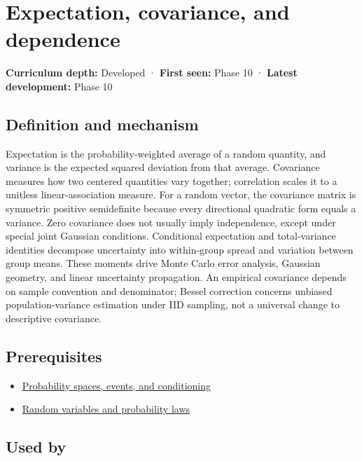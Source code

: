 \hypertarget{appendix-54c383df9992}{}\label{referencestart:appendix-54c383df9992}
\section{Expectation, covariance, and dependence}\label{appendix-54c383df9992-expectation-covariance-and-dependence}

\textbf{Curriculum depth:} Developed · \textbf{First seen:} Phase 10 · \textbf{Latest development:} Phase 10

\subsection{Definition and mechanism}\label{appendix-54c383df9992-definition-and-mechanism}

Expectation is the probability-weighted average of a random quantity, and variance is the expected squared deviation from that average. Covariance measures how two centered quantities vary together; correlation scales it to a unitless linear-association measure. For a random vector, the covariance matrix is symmetric positive semidefinite because every directional quadratic form equals a variance. Zero covariance does not usually imply independence, except under special joint Gaussian conditions. Conditional expectation and total-variance identities decompose uncertainty into within-group spread and variation between group means. These moments drive Monte Carlo error analysis, Gaussian geometry, and linear uncertainty propagation. An empirical covariance depends on sample convention and denominator; Bessel correction concerns unbiased population-variance estimation under IID sampling, not a universal change to descriptive covariance.

\subsection{Prerequisites}\label{appendix-54c383df9992-prerequisites}

\begin{itemize}
\tightlist
\item
  \hyperref[appendix-f1ef323f6ed7]{Probability spaces, events, and conditioning}
\item
  \hyperref[appendix-4d0203f7944f]{Random variables and probability laws}
\end{itemize}

\subsection{Used by}\label{appendix-54c383df9992-used-by}

